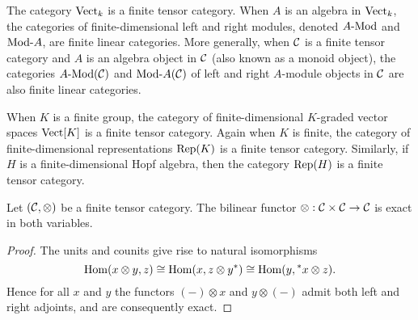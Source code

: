 \documentclass{amsart}
\begin{document}
\begin{example}
	The category $\mathrm{Vect}_k$ is a finite tensor category. When $A$ is an algebra in $\mathrm{Vect}_k$, the categories of finite-dimensional left and right modules, denoted $\Mod{A}{}$ and $\Mod{}{A}$, are finite linear categories. More generally, when $\mathcal C$ is a finite tensor category and $A$ is an algebra object in $\mathcal C$ (also known as a monoid object), the categories $\Mod{A}{}(\cC)$ and $\Mod{}{A}(\cC)$ of left and right $A$-module objects in $\mathcal C$ are also finite linear categories.
\end{example}

\begin{example}
When $K$ is a finite group, the category of finite-dimensional $K$-graded vector spaces $\mathrm{Vect}[K]$ is a finite tensor category.  Again when $K$ is finite, the category of finite-dimensional representations $\mathrm{Rep}(K)$ is a finite tensor category.  Similarly, if $H$ is a finite-dimensional Hopf algebra, then the category $\mathrm{Rep}(H)$ is a finite tensor category.%
\end{example}


\begin{lemma} \cite[2.1.8]{MR1797619} \cite[Prop. 1.13.1]{EGNO}  \label{lma:RigidIsExact}
	Let $(\mathcal C, \otimes)$ be a finite tensor category. The bilinear functor $\otimes: \mathcal C \times \mathcal C \to \mathcal C$ is exact in both variables. 
\end{lemma}

\begin{proof}
	The units and counits give rise to natural isomorphisms
 \begin{equation*} 
 	\operatorname{Hom}(x \otimes y, z) \cong \operatorname{Hom}( x, z \otimes y^*) \cong \operatorname{Hom}(y, {}^*x \otimes z).
 \end{equation*}
	Hence for all $x$ and $y$ the functors $(-)\otimes x$ and $y \otimes (-)$ admit both left and right adjoints, and are consequently exact. %
\end{proof} 
\end{document}
